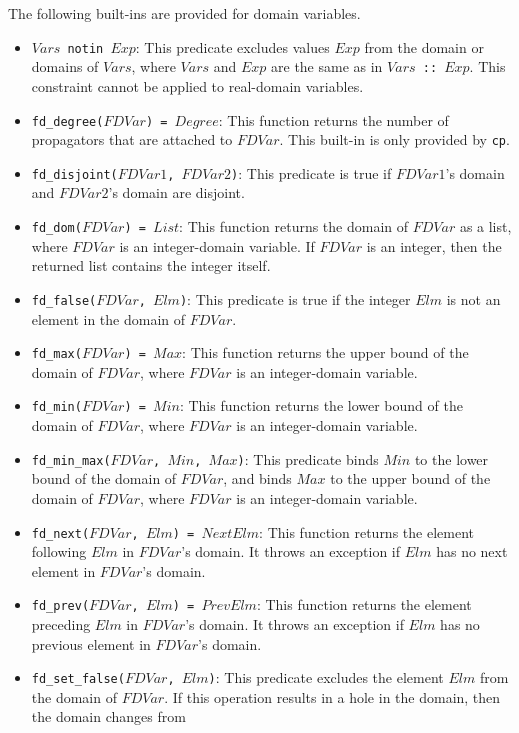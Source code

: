 The following built-ins are provided for domain variables.
\begin{itemize}
\item \texttt{$Vars$ notin $Exp$}: This predicate excludes values $Exp$ from the domain or domains of $Vars$, where $Vars$ and $Exp$ are the same as in \texttt{$Vars$ :: $Exp$}. This constraint cannot be applied to real-domain variables.
\item \texttt{fd\_degree($FDVar$) = $Degree$}: This function returns the number of propagators that are attached to $FDVar$. This built-in is only provided by {\tt cp}.
\item \texttt{fd\_disjoint($FDVar1$, $FDVar2$)}: This predicate is true if $FDVar1$'s domain and $FDVar2$'s domain are disjoint.
\item \texttt{fd\_dom($FDVar$) = $List$}: This function returns the domain of $FDVar$ as a list,  where $FDVar$ is an integer-domain variable. If $FDVar$ is an integer, then the returned list contains the integer itself.
\item \texttt{fd\_false($FDVar$, $Elm$)}: This predicate is true if the integer $Elm$ is not an element in the domain of $FDVar$.
\item \texttt{fd\_max($FDVar$) = $Max$}: This function returns the upper bound of the domain of $FDVar$, where $FDVar$ is an integer-domain variable.
\item \texttt{fd\_min($FDVar$) = $Min$}: This function returns the lower bound of the domain of $FDVar$, where $FDVar$ is an integer-domain variable.
\item \texttt{fd\_min\_max($FDVar$, $Min$, $Max$)}: This predicate binds $Min$ to the lower bound of the domain of $FDVar$, and binds $Max$ to the upper bound of the domain of $FDVar$, where $FDVar$ is an integer-domain variable.
\item \texttt{fd\_next($FDVar$, $Elm$) = $NextElm$}: This function returns the element following $Elm$ in $FDVar$'s domain. It throws an exception if $Elm$ has no next element in $FDVar$'s domain.
\item \texttt{fd\_prev($FDVar$, $Elm$) = $PrevElm$}: This function returns the element preceding $Elm$ in $FDVar$'s domain. It throws an exception if $Elm$ has no previous element in $FDVar$'s domain.
\item \texttt{fd\_set\_false($FDVar$, $Elm$)}: This predicate excludes the element $Elm$ from the domain of $FDVar$. If this operation results in a hole in the domain, then the domain changes from 

\end{itemize}

